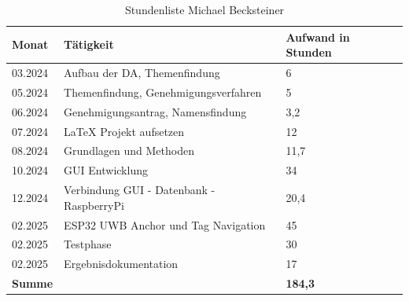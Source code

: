 \begin{table}[h]
	\begin{tabular}{p{2.5cm} p{10.5cm} p{2.5cm}}
		\hline
		\textbf{Monat} & \textbf{Tätigkeit} & \textbf{Aufwand in Stunden} \\
		\hline
		03.2024 & Aufbau der DA, Themenfindung & 6 \\
		05.2024 & Themenfindung, Genehmigungsverfahren & 5 \\
		06.2024 & Genehmigungsantrag, Namensfindung & 3,2 \\
		07.2024 & LaTeX Projekt aufsetzen& 12 \\
		08.2024 & Grundlagen und Methoden & 11,7 \\
		10.2024 & GUI Entwicklung & 34 \\
		12.2024 & Verbindung GUI - Datenbank - RaspberryPi & 20,4 \\
		02.2025 & ESP32 UWB Anchor und Tag Navigation & 45 \\
		02.2025 & Testphase & 30 \\
		02.2025 &Ergebnisdokumentation & 17 \\
		
		\hline
		\textbf{Summe} & & \textbf{184,3} \\
		\hline
	\end{tabular}
	\caption{Stundenliste Michael Becksteiner}
	\label{tab:arbeitsaufwand_Becksteiner}
\end{table}

\newpage
